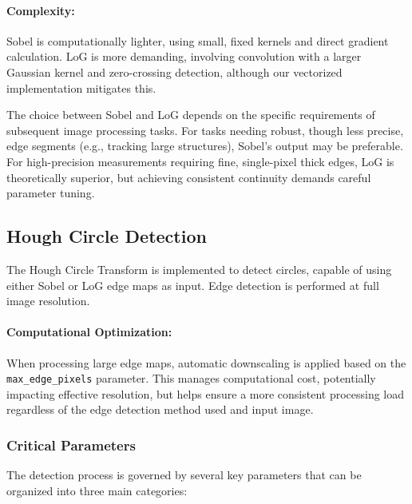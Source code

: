 \documentclass[12pt,a4paper]{article}
\begin{document}
\paragraph{Complexity:} Sobel is computationally lighter, using small, fixed kernels and direct gradient calculation. LoG is more demanding, involving convolution with a larger Gaussian kernel and zero-crossing detection, although our vectorized implementation mitigates this.

\vspace{5mm}

The choice between Sobel and LoG depends on the specific requirements of subsequent image processing tasks. For tasks needing robust, though less precise, edge segments (e.g., tracking large structures), Sobel's output may be preferable. For high-precision measurements requiring fine, single-pixel thick edges, LoG is theoretically superior, but achieving consistent continuity demands careful parameter tuning.







\subsection{Hough Circle Detection}

The Hough Circle Transform is implemented to detect circles, capable of using either Sobel or LoG edge maps as input. Edge detection is performed at full image resolution. 

\paragraph{Computational Optimization:}
When processing large edge maps, automatic downscaling is applied based on the \texttt{max\_edge\_pixels} parameter. This manages computational cost, potentially impacting effective resolution, but helps ensure a more consistent processing load regardless of the edge detection method used and input image.

\subsubsection{Critical Parameters}
The detection process is governed by several key parameters that can be organized into three main categories:
\end{document}
